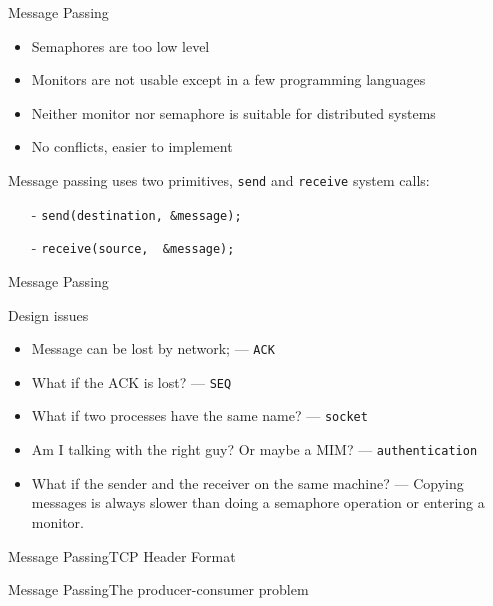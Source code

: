 \begin{frame}{Message Passing}
  \begin{itemize}
  \item Semaphores are too low level
  \item Monitors are not usable except in a few programming languages
  \item Neither monitor nor semaphore is suitable for distributed systems
  \item No conflicts, easier to implement
  \end{itemize}
  Message passing uses two primitives, \texttt{send} and \texttt{receive} system calls:
  \begin{itemize}
  \item[-] \texttt{send(destination,\ \&message);}
  \item[-] \texttt{receive(source, \ \&message);}
  \end{itemize}
\end{frame}

\begin{frame}{Message Passing}
  \begin{block}{Design issues}
    \begin{itemize}
    \item Message can be lost by network; --- \texttt{ACK}
    \item What if the ACK is lost? --- \texttt{SEQ}
    \item What if two processes have the same name? --- \texttt{socket}
    \item Am I talking with the right guy? Or maybe a MIM? --- \texttt{authentication}
    \item What if the sender and the receiver on the same machine? --- Copying messages is
      always slower than doing a semaphore operation or entering a monitor.
    \end{itemize}
  \end{block}
\end{frame}

\begin{frame}{Message Passing}{TCP Header Format}
  \begin{center}
  \end{center}
\end{frame}

\begin{frame}{Message Passing}{The producer-consumer problem}
  \centering
\end{frame}

